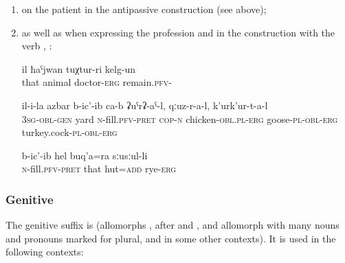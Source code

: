 \begin{enumerate}
	\item	on the patient in the antipassive construction (see  above);

	\item	as well as when expressing the profession  and in the construction with the verb  , :
	\begin{exe}
			\ex	\label{ex:He was the veterinarian}
		\gll	il	ħaˁjwan	tuχtur-ri	kelg-un\\
			that	animal	doctor-\textsc{erg}	remain.\textsc{pfv}-\\
		\glt	{}
		
		\ex
		\begin{xlist}
			\ex	\label{ex:His yard was filled with chickens, turkeys, and geese}
			\gll	 il-i-la		azbar	b-ic'-ib ca-b	ʡuˁrʡ-aˁ-l,	qːuz-r-a-l,	k'urk'ur-t-a-l\\
				3\textsc{sg}-\textsc{obl}-\textsc{gen}	yard	\textsc{n}-fill.\textsc{pfv}-\textsc{pret} \textsc{cop-n}	chicken-\textsc{obl}.\textsc{pl}-\textsc{erg}	goose-\textsc{pl}-\textsc{obl}-\textsc{erg} turkey.cock-\textsc{pl}-\textsc{obl}-\textsc{erg}\\
			\glt	{}
	
			\ex	\label{ex:And they also filled the hut with rye}
			\gll	b-ic'-ib	hel	buq'a=ra	sːusːul-li\\
				\textsc{n}-fill.\textsc{pfv}-\textsc{pret}	that	hut=\textsc{add}	rye-\textsc{erg}\\
			\glt	{}
		\end{xlist}
		
	\end{exe}
\end{enumerate}



\subsubsection{Genitive}
\label{sssec:Genitive}

The genitive suffix is  (allomorphs ,  after  and , and allomorph  with many nouns and pronouns marked for plural, and in some other contexts). It is used in the following contexts:

